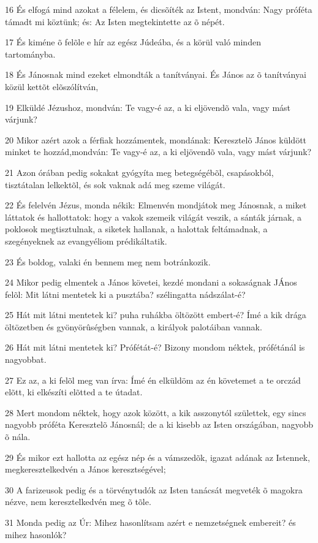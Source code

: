 \par 16 És elfogá mind azokat a félelem, és dicsõíték az Istent, mondván: Nagy próféta támadt mi köztünk; és: Az Isten megtekintette az õ népét.
\par 17 És kiméne õ felõle e hír az egész Júdeába, és a körül való minden tartományba.
\par 18 És Jánosnak mind ezeket elmondták a tanítványai. És János az õ tanítványai közül kettõt elõszólítván,
\par 19 Elküldé Jézushoz, mondván: Te vagy-é az, a ki eljövendõ vala, vagy mást várjunk?
\par 20 Mikor azért azok a férfiak hozzámentek, mondának: Keresztelõ János küldött minket te hozzád,mondván: Te vagy-é az, a ki eljövendõ vala, vagy mást várjunk?
\par 21 Azon órában pedig sokakat gyógyíta meg betegségébõl, csapásokból, tisztátalan lelkektõl, és sok vaknak adá meg szeme világát.
\par 22 És felelvén Jézus, monda nékik: Elmenvén mondjátok meg Jánosnak, a miket láttatok és hallottatok: hogy a vakok szemeik világát veszik, a sánták járnak, a poklosok megtisztulnak, a siketek hallanak, a halottak feltámadnak, a szegényeknek az evangyéliom prédikáltatik.
\par 23 És boldog, valaki én bennem meg nem botránkozik.
\par 24 Mikor pedig elmentek a János követei, kezdé mondani a sokaságnak JÁnos felõl: Mit látni mentetek ki a pusztába? szélingatta nádszálat-é?
\par 25 Hát mit látni mentetek ki? puha ruhákba öltözött embert-é? Ímé a kik drága öltözetben és gyönyörûségben vannak, a királyok palotáiban vannak.
\par 26 Hát mit látni mentetek ki? Prófétát-é? Bizony mondom néktek, prófétánál is nagyobbat.
\par 27 Ez az, a ki felõl meg van írva: Ímé én elküldöm az én követemet a te orczád elõtt, ki elkészíti elõtted a te útadat.
\par 28 Mert mondom néktek, hogy azok között, a kik asszonytól születtek, egy sincs nagyobb próféta Keresztelõ Jánosnál; de a ki kisebb az Isten országában, nagyobb õ nála.
\par 29 És mikor ezt hallotta az egész nép és a vámszedõk, igazat adának az Istennek, megkeresztelkedvén a János keresztségével;
\par 30 A farizeusok pedig és a törvénytudók az Isten tanácsát megveték õ magokra nézve, nem keresztelkedvén meg õ tõle.
\par 31 Monda pedig az Úr: Mihez hasonlítsam azért e nemzetségnek embereit? és mihez hasonlók?
